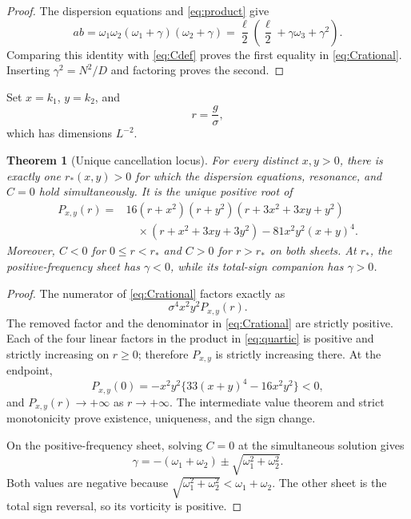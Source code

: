 \documentclass[11pt]{article}
\newtheorem{theorem}{Theorem}
\theoremstyle{remark}
\begin{document}
\begin{proof}
The dispersion equations and \eqref{eq:product} give
\[
 ab=\omega_1\omega_2(\omega_1+\gamma)(\omega_2+\gamma)
   =\frac{\ell}{2}\left(\frac{\ell}{2}
     +\gamma\omega_3+\gamma^2\right).
\]
Comparing this identity with \eqref{eq:Cdef} proves the first equality in
\eqref{eq:Crational}. Inserting \(\gamma^2=N^2/D\) and factoring proves the
second.
\end{proof}

Set \(x=k_1\), \(y=k_2\), and
\[
 r=\frac{g}{\sigma},
\]
which has dimensions \(L^{-2}\).

\begin{theorem}[Unique cancellation locus]\label{thm:zero}
For every distinct \(x,y>0\), there is exactly one \(r_*(x,y)>0\) for which
the dispersion equations, resonance, and \(C=0\) hold simultaneously.
It is the unique positive root of
\begin{equation}
\begin{split}
 P_{x,y}(r)={}&16(r+x^2)(r+y^2)
 (r+3x^2+3xy+y^2)\\
 &\quad\times(r+x^2+3xy+3y^2)
 -81x^2y^2(x+y)^4.                              \label{eq:quartic}
\end{split}
\end{equation}
Moreover, \(C<0\) for \(0\leq r<r_*\) and \(C>0\) for \(r>r_*\) on both
sheets. At \(r_*\), the positive-frequency sheet has \(\gamma<0\), while
its total-sign companion has \(\gamma>0\).
\end{theorem}

\begin{proof}
The numerator of \eqref{eq:Crational} factors exactly as
\[
 \sigma^4x^2y^2P_{x,y}(r).
\]
The removed factor and the denominator in \eqref{eq:Crational} are strictly
positive. Each of the four linear factors in the product in
\eqref{eq:quartic} is positive and strictly increasing on \(r\geq0\);
therefore \(P_{x,y}\) is strictly increasing there. At the endpoint,
\begin{equation}
 P_{x,y}(0)=-x^2y^2\{33(x+y)^4-16x^2y^2\}<0,    \label{eq:P0}
\end{equation}
and \(P_{x,y}(r)\to+\infty\) as \(r\to+\infty\). The intermediate value
theorem and strict monotonicity prove existence, uniqueness, and the sign
change.

On the positive-frequency sheet, solving \(C=0\) at the simultaneous
solution gives
\[
 \gamma=-(\omega_1+\omega_2)
       \pm\sqrt{\omega_1^2+\omega_2^2}.
\]
Both values are negative because
\(\sqrt{\omega_1^2+\omega_2^2}<\omega_1+\omega_2\). The other sheet is the
total sign reversal, so its vorticity is positive.
\end{proof}
\end{document}

